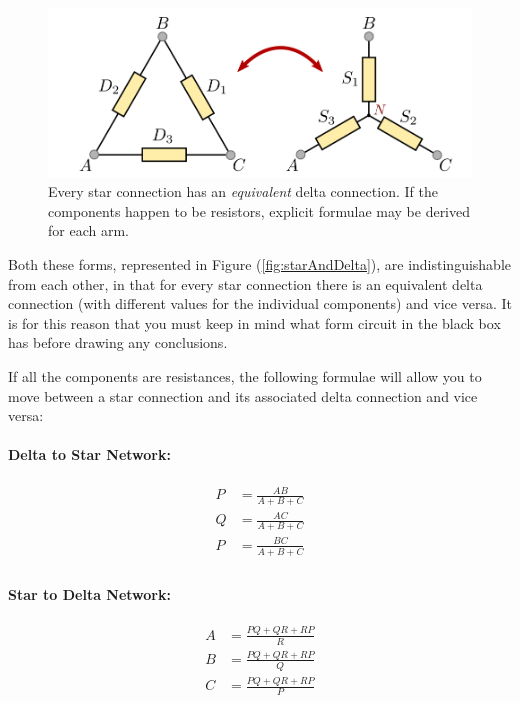 \begin{refsection}
\begin{figure}[!htb]
\centering
\includegraphics[scale=0.4]{figs/bb-starToDelta.png}
\caption{Every star connection has an \textit{equivalent} delta connection. If the components happen to be resistors, explicit formulae may be derived for each arm.}
\label{fig:starToDelta}
\end{figure}

 Both these forms, represented in Figure (\ref{fig:starAndDelta}), are indistinguishable from each other, in that for every star connection there is an equivalent delta connection (with different values for the individual components) and vice versa. It is for this reason that you must keep in mind what form circuit in the black box has before drawing any conclusions.

\begin{imp}
If all the components are resistances, the following formulae will allow you to move between a star connection and its associated delta connection and vice versa:

\begin{minipage}{0.5\textwidth}
\centering
\paragraph*{Delta to Star Network:}
\begin{equation*}
\begin{aligned}
P &= \frac{A B}{A + B + C}\\
Q &= \frac{A C}{A + B + C}\\
P &= \frac{B C}{A + B + C}\\
\end{aligned}
\end{equation*}
\end{minipage}
\begin{minipage}{0.5\textwidth}
\centering
\paragraph*{Star to Delta Network:}
\begin{equation*}
\begin{aligned}
A &= \frac{P Q + Q R + R P}{R}\\
B &= \frac{P Q + Q R + R P}{Q}\\
C &= \frac{P Q + Q R + R P}{P}\\
\end{aligned}
\end{equation*}


\end{minipage}
\end{imp}
\end{refsection}

